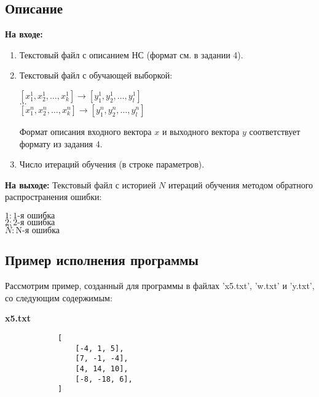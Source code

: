 \documentclass[bachelor, och, report]{../shiza}
\begin{document}
    \subsection{Описание}

        \textbf{На входе:}
            \begin{enumerate}
                \item Текстовый файл с описанием НС (формат см. в задании 4).
                \item Текстовый файл с обучающей выборкой:
                    \begin{center}
                        $[x_{1}^{1}, x_{2}^1, \dots, x_{k}^1] \rightarrow [y_{1}^1, y_{2}^1, \dots, y_{l}^1]$ \\
                        $\dots$\\
                        $[x_{1}^n, x_{2}^n, \dots, x_{k}^n] \rightarrow [y_{1}^n, y_{2}^n, \dots, y_{l}^n]$ \\
                    \end{center}
                    Формат описания входного вектора $x$ и выходного вектора $y$ соответствует формату из задания 4. 
                \item Число итераций обучения (в строке параметров).
            \end{enumerate}

        \textbf{На выходе:} Текстовый файл с историей $N$ итераций обучения методом обратного распространения ошибки:
        \begin{center}
            $1 : \text{1-я ошибка}$ \\
            $2 : \text{2-я ошибка}$ \\
                $\dots$\\
            $N : \text{N-я ошибка}$ \\
        \end{center}


    \subsection{Пример исполнения программы}

        Рассмотрим пример, созданный для программы в файлах 'x5.txt', 'w.txt' и
        'y.txt', со следующим содержимым:

        \textbf{x5.txt}
        \begin{verbatim}
            [
                [-4, 1, 5],
                [7, -1, -4],
                [4, 14, 10],
                [-8, -18, 6],
            ]
        \end{verbatim}
\end{document}
